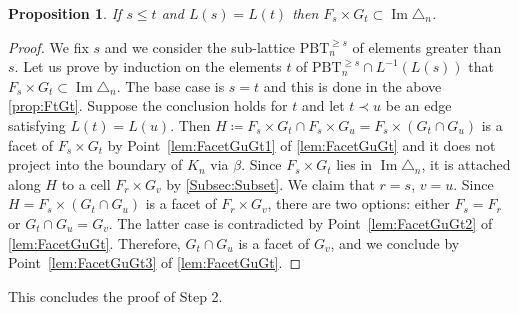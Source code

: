 \documentclass[10pt,a4paper]{amsart}
\numberwithin{equation}{section}\providecommand{\No}{}
\theoremstyle{plain}
\newtheorem{proposition}{Proposition}
\theoremstyle{definition}
\newcommand{\K}{{K}}
\newcommand{\Tam}[1]{\mathrm{PBT}_{#1}}
\DeclareMathOperator{\im}{\mathrm{Im}}
\begin{document}
\begin{proposition}
If $s\leq t$ and $L(s) = L(t)$ then $F_s\times G_t\subset \im\triangle_n$.
\end{proposition}

\begin{proof}
We fix $s$ and we consider the sub-lattice $\Tam{n}^{\geq s}$ of elements greater than~$s$.
Let us prove by induction on the elements $t$ of $\Tam{n}^{\geq s}\cap L^{-1}(L(s))$ that
$F_s\times G_t\subset \im\triangle_n$.
The base case is $s=t$ and this is done in the above \cref{prop:FtGt}.
Suppose the conclusion holds for $t$ and let $t\prec u$ be an edge satisfying $L(t)= L(u)$.
Then $H \coloneqq F_s\times G_t\cap F_s\times G_u = F_s\times (G_t\cap G_u)$ is a facet of $F_s\times G_t$
by Point~\eqref{lem:FacetGuGt1} of \cref{lem:FacetGuGt} and it does not project into the boundary of $\K_n$ via $\beta$.
Since $F_s\times G_t$ lies in $\im\triangle_n$, it is attached along $H$ to a cell
$F_r\times G_v$ by \cref{Subsec:Subset}.
We claim that $r=s$, $v=u$.
Since $H=F_s\times (G_t\cap G_u)$ is a facet of $F_r\times G_v$, there are two options: either $F_s=F_r$ or $G_t\cap G_u=G_v$. The latter case is contradicted by Point~\eqref{lem:FacetGuGt2} of \cref{lem:FacetGuGt}.
Therefore, $G_t\cap G_u$ is a facet of $G_v$, and we conclude by
Point~\eqref{lem:FacetGuGt3} of \cref{lem:FacetGuGt}.
\end{proof}

This concludes the proof of Step 2.
\end{document}
